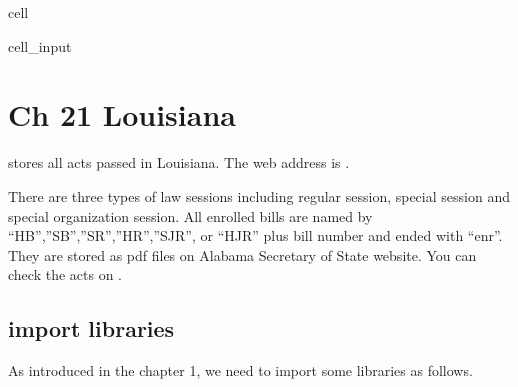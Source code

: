 \documentclass[letterpaper,10pt,english]{jupyterBook}
\begin{document}
\begin{sphinxuseclass}{cell}
\begin{sphinxVerbatimInput}
\begin{sphinxuseclass}{cell_input}
\begin{sphinxVerbatim}[commandchars=\\\{\}]
\end{sphinxVerbatim}

\end{sphinxuseclass}\end{sphinxVerbatimInput}

\end{sphinxuseclass}
\sphinxstepscope


\chapter{Ch 21 Louisiana}
\label{\detokenize{ch21:ch-21-louisiana}}\label{\detokenize{ch21::doc}}
\sphinxAtStartPar
{} stores all acts passed in Louisiana. The web address is .

\sphinxAtStartPar
{}

\sphinxAtStartPar
There are three types of law sessions including regular session, special session and special organization session. All enrolled bills are named by “HB”,”SB”,”SR”,”HR”,”SJR”, or “HJR” plus bill number and ended with “\sphinxhyphen{}enr”. They are stored as pdf files on Alabama Secretary of State website. You can check the acts on .


\section{import libraries}
\label{\detokenize{ch21:import-libraries}}
\sphinxAtStartPar
As introduced in the chapter 1, we need to import some libraries as follows.
\end{document}

